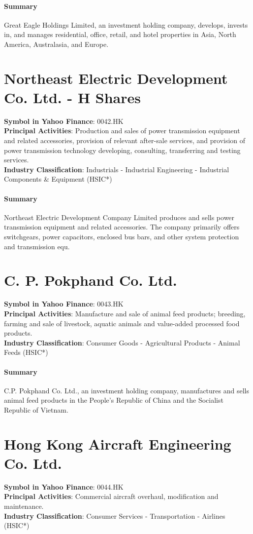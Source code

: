\paragraph{Summary}
Great Eagle Holdings Limited, an investment holding company, develops, invests in, and manages residential, office, retail, and hotel properties in Asia, North America, Australasia, and Europe.


\section{Northeast Electric Development Co. Ltd. - H Shares}
\textbf{Symbol in Yahoo Finance}: 0042.HK\\
\textbf{Principal Activities}: Production and sales of power transmission equipment and related accessories, provision of relevant after-sale services, and provision of power transmission technology developing, consulting, transferring and testing services.\\
\textbf{Industry Classification}: Industrials - Industrial Engineering - Industrial Components \& Equipment (HSIC*)
\paragraph{Summary}
Northeast Electric Development Company Limited produces and sells power transmission equipment and related accessories. The company primarily offers switchgears, power capacitors, enclosed bus bars, and other system protection and transmission equ.


\section{C. P. Pokphand Co. Ltd.}
\textbf{Symbol in Yahoo Finance}: 0043.HK\\
\textbf{Principal Activities}: Manufacture and sale of animal feed products; breeding, farming and sale of livestock, aquatic animals and value-added processed food products.\\
\textbf{Industry Classification}: Consumer Goods - Agricultural Products - Animal Feeds (HSIC*)
\paragraph{Summary}
C.P. Pokphand Co. Ltd., an investment holding company, manufactures and sells animal feed products in the People's Republic of China and the Socialist Republic of Vietnam.


\section{Hong Kong Aircraft Engineering Co. Ltd.}
\textbf{Symbol in Yahoo Finance}: 0044.HK\\
\textbf{Principal Activities}: Commercial aircraft overhaul, modification and maintenance.\\
\textbf{Industry Classification}: Consumer Services - Transportation - Airlines (HSIC*)
